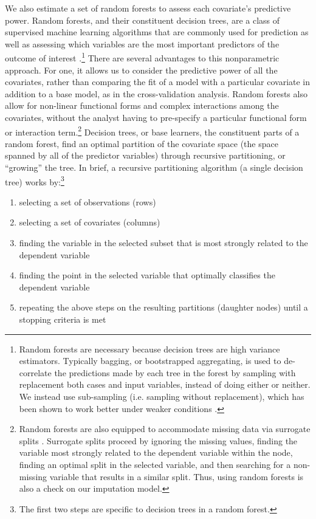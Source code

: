 \documentclass[11pt]{article}
\begin{document}
We also estimate a set of random forests to assess each covariate's predictive power. Random forests, and their constituent decision trees, are a class of supervised machine learning algorithms that are commonly used for prediction as well as assessing which variables are the most important predictors of the outcome of interest  \citep[pp. 543-551]{murphy2012machine}.\footnote{Random forests are necessary because decision trees are high variance estimators. Typically bagging, or bootstrapped aggregating, is used to de-correlate the predictions made by each tree in the forest by sampling with replacement both cases and input variables, instead of doing either or neither. We instead use sub-sampling (i.e. sampling without replacement), which has been shown to work better under weaker conditions \citep{politis-sub}.} There are several advantages to this nonparametric approach. For one, it allows us to consider the predictive power of all the covariates, rather than comparing the fit of a model with a particular covariate in addition to a base model, as in the cross-validation analysis. Random forests also allow for non-linear functional forms and complex interactions among the covariates, without the analyst having to pre-specify a particular functional form or interaction term.\footnote{Random forests are also equipped to accommodate missing data via surrogate splits \citep{hothorn2006unbiased}. Surrogate splits proceed by ignoring the missing values, finding the variable most strongly related to the dependent variable within the node, finding an optimal split in the selected variable, and then searching for a non-missing variable that results in a similar split. Thus, using random forests is also a check on our imputation model.} Decision trees, or base learners, the constituent parts of a random forest, find an optimal partition of the covariate space (the space spanned by all of the predictor variables) through recursive partitioning, or ``growing'' the tree. In brief, a recursive partitioning algorithm (a single decision tree) works by:\footnote{The first two steps are specific to decision trees in a random forest.}
\begin{enumerate}
\item selecting a set of observations (rows)
\item selecting a set of covariates (columns)
\item finding the variable in the selected subset that is most strongly related to the dependent variable
\item finding the point in the selected variable that optimally classifies the dependent variable
\item repeating the above steps on the resulting partitions (daughter nodes) until a stopping criteria is met
\end{enumerate}
\end{document}
